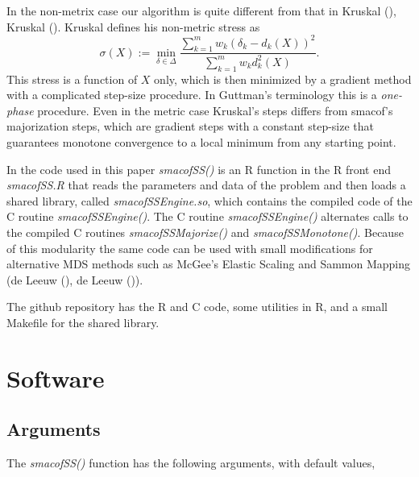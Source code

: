 \documentclass[
  12pt,
  letterpaper,
  DIV=11,
  numbers=noendperiod]{scrartcl}
\begin{document}
In the non-metrix case our algorithm is quite different from that in
Kruskal (), Kruskal
(). Kruskal defines his non-metric
stress as \begin{equation}
  \sigma(X) := \min_{\delta \in \Delta}\frac{\sum_{k=1}^mw_k(\delta_k - d_k(X))^2}{\sum_{k=1}^mw_kd_k^2(X)}.
\end{equation} This stress is a function of \(X\) only, which is then
minimized by a gradient method with a complicated step-size procedure.
In Guttman's terminology this is a \emph{one-phase} procedure. Even in
the metric case Kruskal's steps differs from smacof's majorization
steps, which are gradient steps with a constant step-size that
guarantees monotone convergence to a local minimum from any starting
point.

In the code used in this paper \emph{smacofSS()} is an R function in the
R front end \emph{smacofSS.R} that reads the parameters and data of the
problem and then loads a shared library, called
\emph{smacofSSEngine.so}, which contains the compiled code of the C
routine \emph{smacofSSEngine()}. The C routine \emph{smacofSSEngine()}
alternates calls to the compiled C routines \emph{smacofSSMajorize()}
and \emph{smacofSSMonotone()}. Because of this modularity the same code
can be used with small modifications for alternative MDS methods such as
McGee's Elastic Scaling and Sammon Mapping ({de Leeuw}
(), {de Leeuw}
()).

The github repository has the R and C code, some utilities in R, and a
small Makefile for the shared library.

\section{Software}\label{software}

\subsection{Arguments}\label{arguments}

The \emph{smacofSS()} function has the following arguments, with default
values,
\end{document}

